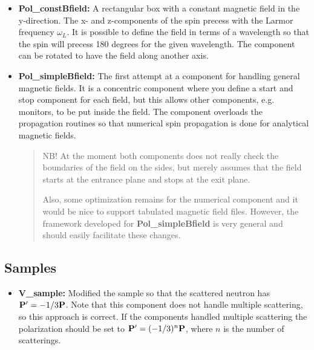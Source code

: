 \begin{itemize}
\item \textbf{Pol\_constBfield:} A rectangular box with a constant magnetic
  field in the y-direction. The x- and z-components of the spin precess with
  the Larmor frequency $\omega_L$. It is possible to define the field in terms
  of a wavelength so that the spin will precess 180 degrees for the given
  wavelength. The component can be rotated to have the field along another
  axis. \\
  
\item \textbf{Pol\_simpleBfield:} The first attempt at a component for
  handling general magnetic fields. It is a concentric component where you
  define a start and stop component for each field, but this allows other
  components, e.g. monitors, to be put inside the field. The component
  overloads the propagation routines so that numerical spin propagation is
  done for analytical magnetic fields. 
  
  \begin{quote}
    NB! At the moment both components does not really check the boundaries of
    the field on the sides, but merely assumes that the field starts at the
    entrance plane and stops at the exit plane.

    Also, some optimization remains for the numerical component and it would
    be nice to support tabulated magnetic field files. However, the framework
    developed for \textbf{Pol\_simpleBfield} is very general and should
    easily facilitate these changes.
  \end{quote}

\end{itemize}


\subsection{Samples}

\begin{itemize}
\item \textbf{V\_sample:} Modified the sample so that the scattered
  neutron has $\mathbf{P}' = -1/3\mathbf{P}$. Note that this component does not
  handle multiple scattering, so this approach is correct. If the
  components handled multiple scattering the polarization should be
  set to $\mathbf{P}' = (-1/3)^n\mathbf{P}$, where $n$ is the number of
  scatterings.\\
\end{itemize}  


